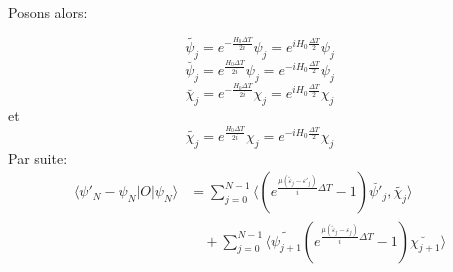 Posons alors:

\begin{equation}
\tilde{\psi_j} = e^{-\frac{H_0 \Delta T}{2i}} \psi_j=e^{iH_0 \frac{\Delta T}{2}} \psi_j
\end{equation}
\begin{equation}
\breve{\psi_j} =e^{\frac{H_0 \Delta T}{2i}} \psi_j= e^{-iH_0 \frac{\Delta T}{2}} \psi_j
\end{equation}
\begin{equation}
\breve{\chi_j} =e^{-\frac{H_0 \Delta T}{2i}}\chi_j= e^{iH_0 \frac{\Delta T}{2}} \chi_j
\end{equation}
et
\begin{equation}
\tilde{\chi_j} = e^{\frac{H_0 \Delta T}{2i}}\chi_j= e^{-iH_0 \frac{\Delta T}{2}} \chi_j
\end{equation}
Par suite:
\begin{align*}
\langle \psi'_N-\psi_N |O|\psi_N \rangle &= \sum_{j=0}^{N-1} \langle (e^{\frac{\mu(\tilde{\varepsilon}_j-\varepsilon'_j)}{i}\Delta T}-1)\breve{\psi'_j} , \tilde{\chi_j} \rangle\\
&\quad +\sum_{j=0}^{N-1} \langle \tilde{\psi_{j+1}} (e^{\frac{\mu(\tilde{\varepsilon}_j-\varepsilon_j)}{i}\Delta T}-1)\breve{\chi_{j+1}} \rangle
\end{align*}

